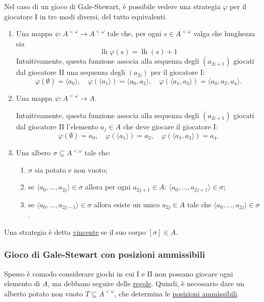 \documentclass[titlepage]{article}
\newcommand{\1}{\mathds{1}}
\theoremstyle{definition}%
\theoremstyle{plain}
\theoremstyle{remark}
\begin{document}
Nel caso di un gioco di Gale-Stewart, è possibile vedere una strategia \(\varphi\) per il giocatore I in tre modi diversi, del tutto equivalenti.
\begin{enumerate}
\item Una mappa \(\psi: A^{<\omega}\to A^{<\omega}\) tale che, per ogni \(s \in A^{<\omega}\) valga che {lunghezza} sia
\begin{equation*}
 \operatorname{lh}\varphi(s) = \operatorname{lh}(s) + 1
\end{equation*}
Intuitivamente, questa funzione associa alla sequenza degli \((a_{2i+1})\) giocati dal giocatore II una sequenza degli \((a_{2i})\) per il giocatore I:
\begin{equation*}
 \varphi(\emptyset) = \langle a_{0}\rangle,\quad \varphi(\langle a_{1}\rangle) = \langle a_{0},a_{2} \rangle,\quad \varphi(\langle a_{1},a_{3}\rangle) = \langle a_{0},a_{2},a_{4}\rangle.
\end{equation*}
\item Una mappa \(\psi: A^{<\omega}\to A\).

Intuitivamente, questa funzione associa alla sequenza degli \((a_{2i+1})\) giocati dal giocatore II l'elemento \(a_{j} \in A\) che deve giocare il giocatore I:
\begin{equation*}
 \varphi(\emptyset) = a_{0},\quad \varphi(\langle a_{1}\rangle) = a_{2},\quad \varphi(\langle a_{1},a_{3}\rangle) = a_{4}.
\end{equation*}
\item Una {albero} \(\sigma \subseteq A^{<\omega}\) tale che:
\begin{enumerate}
\item \(\sigma\) sia {potato} e non vuoto;

\item se \(\langle a_{0},\dots,a_{2j}\rangle \in \sigma\) allora per ogni \(a_{2j+1} \in A\): \(\langle a_{0},\dots,a_{2j+1}\rangle \in \sigma\);

\item se \(\langle a_{0},\dots,a_{2j-1}\rangle \in \sigma\) allora esiste un unico \(a_{2j} \in A\) tale che \(\langle a_{0},\dots,a_{2j}\rangle \in \sigma\).
\end{enumerate}
\end{enumerate}

Una strategia è detta \uline{vincente} se il suo {corpo} \([\sigma] \in A\).

\subsubsection{Gioco di Gale-Stewart con posizioni ammissibili}
\label{sec:org32c74c6}
Spesso è comodo considerare giochi in cui I e II non possano giocare ogni elemento di \(A\), ma debbano seguire delle \uline{regole}. Quindi, è necessario dare un alberto potato non vuoto \(T \subseteq A^{<\omega}\), che determina le \uline{posizioni ammissibili}.
\end{document}
